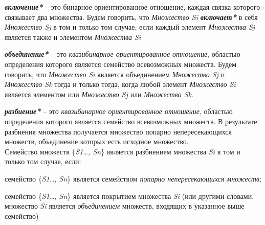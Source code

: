 \textbf{\textit{включение*}} – это бинарное ориентированное отношение, каждая связка которого связывает два множества. Будем говорить, что \textit{Множество Si} \textbf{\textit{включает*}} в себя \textit{Множество Sj} в том и только том случае, если каждый элемент \textit{Множества Sj} является также и элементом \textit{Множества Si}

\begin{SCn}
\end{SCn}
	
\textbf{\textit{объединение*}} – это \textit{квазибинарное ориентированное отношение}, областью определения которого является семейство всевозможных множеств. Будем говорить, что \textit{Множество Si} является объединением \textit{Множество Sj} и \textit{Множество Sk} тогда и только тогда, когда любой элемент \textit{Множество Si} является элементом или \textit{Множество Sj} или \textit{Множество Sk}.

\begin{SCn}
\end{SCn}
	
\textbf{\textit{разбиение*}} – это \textit{квазибинарное ориентированное отношение}, областью определения которого является семейство всевозможных множеств. В результате разбиения множества получается множество попарно непересекающихся множеств, объединение которых есть исходное множество.\\
Семейство множеств \{\textit{S1…, Sn}\} является разбиением множества \textit{Si} в том и только том случае, если:
\begin{textitemize}
		\item семейство \{\textit{S1…, Sn}\} является семейством \textit{попарно непересекающихся множеств};
		\item семейство \{\textit{S1…, Sn}\} является покрытием множества \textit{Si} (или другими словами, множество \textit{Si} является \textit{объединением} множеств, входящих в указанное выше семейство)
\end{textitemize}

